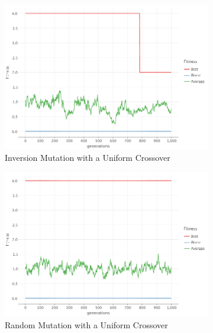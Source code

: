     \begin{figure}[ht!]
        \centering
        \begin{subfigure}{0.45\textwidth}
            \includegraphics[width=\textwidth]{img/beacon_uniform_inv_1.png}
            \caption{Inversion Mutation with a Uniform Crossover}
            \label{fig:beacon:3:inversion}
        \end{subfigure}
        \begin{subfigure}{0.45\textwidth}
            \includegraphics[width=\textwidth]{img/beacon_uniform_random_1.png}
            \caption{Random Mutation with a Uniform Crossover}
            \label{fig:beacon:3:random}
        \end{subfigure}
        \begin{subfigure}{0.45\textwidth}

\end{subfigure}
\end{figure}

